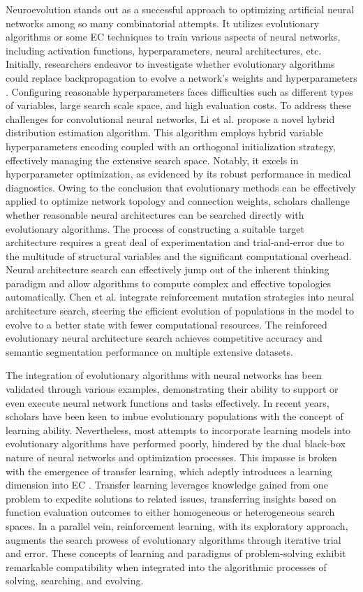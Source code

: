 \documentclass[journal,twoside]{IEEEtran}
\begin{document}
Neuroevolution stands out as a successful approach to optimizing artificial neural networks among so many combinatorial attempts. It utilizes evolutionary algorithms or some EC techniques to train various aspects of neural networks, including activation functions, hyperparameters, neural architectures, etc. Initially, researchers endeavor to investigate whether evolutionary algorithms could replace backpropagation to evolve a network's weights and hyperparameters \cite{galvan2021neuroevolution}. Configuring reasonable hyperparameters faces difficulties such as different types of variables, large search scale space, and high evaluation costs. To address these challenges for convolutional neural networks, Li et al. \cite{9540902} propose a novel hybrid distribution estimation algorithm. This algorithm employs hybrid variable hyperparameters encoding coupled with an orthogonal initialization strategy, effectively managing the extensive search space. Notably, it excels in hyperparameter optimization, as evidenced by its robust performance in medical diagnostics. Owing to the conclusion that evolutionary methods can be effectively applied to optimize network topology and connection weights, scholars challenge whether reasonable neural architectures can be searched directly with evolutionary algorithms. The process of constructing a suitable target architecture requires a great deal of experimentation and trial-and-error due to the multitude of structural variables and the significant computational overhead. Neural architecture search can effectively jump out of the inherent thinking paradigm and allow algorithms to compute complex and effective topologies automatically. Chen et al. \cite{chen2019renas} integrate reinforcement mutation strategies into neural architecture search, steering the efficient evolution of populations in the model to evolve to a better state with fewer computational resources. The reinforced evolutionary neural architecture search achieves competitive accuracy and semantic segmentation performance on multiple extensive datasets.

The integration of evolutionary algorithms with neural networks has been validated through various examples, demonstrating their ability to support or even execute neural network functions and tasks effectively. In recent years, scholars have been keen to imbue evolutionary populations with the concept of learning ability. Nevertheless, most attempts to incorporate learning models into evolutionary algorithms have performed poorly, hindered by the dual black-box nature of neural networks and optimization processes. This impasse is broken with the emergence of transfer learning, which adeptly introduces a learning dimension into EC \cite{zhang2023survey}. Transfer learning leverages knowledge gained from one problem to expedite solutions to related issues, transferring insights based on function evaluation outcomes to either homogeneous or heterogeneous search spaces. In a parallel vein, reinforcement learning, with its exploratory approach, augments the search prowess of evolutionary algorithms through iterative trial and error. These concepts of learning and paradigms of problem-solving exhibit remarkable compatibility when integrated into the algorithmic processes of solving, searching, and evolving.
\end{document}
